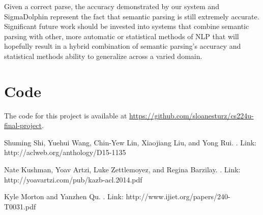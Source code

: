 \documentclass[11pt]{article}
\begin{document}
Given a correct parse, the accuracy demonstrated by our system and SigmaDolphin represent the fact that semantic parsing is still extremely accurate. Significant future work should be invested into systems that combine semantic parsing with other, more automatic or statistical methods of NLP that will hopefully result in a hybrid combination of semantic parsing's accuracy and statistical methods ability to generalize across a varied domain.

\section{Code}
The code for this project is available at \url{https://github.com/sloanesturz/cs224u-final-project}.

\newpage
%
%
%
\begin{thebibliography}{}
Shuming Shi, Yuehui Wang, Chin-Yew Lin, Xiaojiang Liu, and Yong Rui.
. Link: http://aclweb.org/anthology/D15-1135

Nate Kushman, Yoav Artzi, Luke Zettlemoyez, and Regina Barzilay.
. Link: http://yoavartzi.com/pub/kazb-acl.2014.pdf

Kyle Morton and Yanzhen Qu.
. Link: http://www.ijiet.org/papers/240-T0031.pdf
\end{thebibliography}
\end{document}
